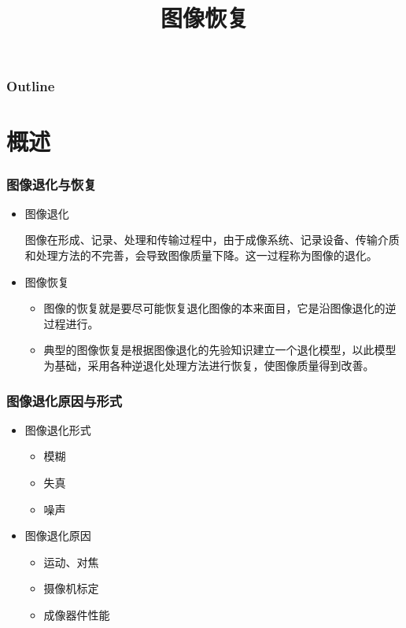 \documentclass{beamer}
\title{图像恢复}
\author{}
\date{}
\begin{document}
\maketitle

\begin{frame}
\frametitle{Outline}
\setcounter{tocdepth}{3}
\tableofcontents
\end{frame}













\section{概述}
\label{sec-1}
\begin{frame}
\frametitle{图像退化与恢复}
\label{sec-1-1}

\begin{itemize}
\item 图像退化

    图像在形成、记录、处理和传输过程中，由于成像系统、记录设备、传输介质和处理方法的不完善，会导致图像质量下降。这一过程称为图像的退化。
\item 图像恢复
\begin{itemize}
\item 图像的恢复就是要尽可能恢复退化图像的本来面目，它是沿图像退化的逆过程进行。
\item 典型的图像恢复是根据图像退化的先验知识建立一个退化模型，以此模型为基础，采用各种逆退化处理方法进行恢复，使图像质量得到改善。
\end{itemize}
\end{itemize}
\end{frame}
\begin{frame}
\frametitle{图像退化原因与形式}
\label{sec-1-2}

\begin{itemize}
\item 图像退化形式
\begin{itemize}
\item 模糊
\item 失真
\item 噪声
\end{itemize}
\item 图像退化原因
\begin{itemize}
\item 运动、对焦
\item 摄像机标定
\item 成像器件性能
\end{itemize}
\end{itemize}
\end{frame}
\end{document}
